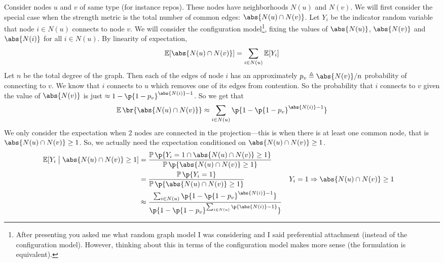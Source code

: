 \documentclass{pset}
\begin{document}
Consider nodes $u$ and $v$ of same type (for instance repos).
These nodes have neighborhoods $N(u)$ and $N(v)$.
We will first consider the special case when the strength metric is
the total number of common edges: $\abs{N(u) \cap N(v)}$.
Let $Y_i$ be the indicator random variable that node $i \in N(u)$
connects to node $v$. 
We will consider the configuration model\footnote{After presenting you asked me what random graph model I was considering and I said preferential attachment (instead of the configuration model). However, thinking about this in terms of the configuration model makes more sense (the formulation is equivalent).}, 
fixing the values of $\abs{N(u)}$, $\abs{N(v)}$ and $\abs{N(i)}$ for all $i \in N(u)$.
By linearity of expectation, 
\[\Exp[\abs{N(u) \cap N(v)}] = \sum_{i\in N(u)} \Exp[Y_i]\]
Let $n$ be the total degree of the graph.
Then each of the edges of node $i$
has an approximately $p_v \triangleq \abs{N(v)} / n$ probability of
connecting to $v$. 
We know that $i$ connects to $u$ which removes one of its edges from contention.
So the probability that $i$ connects to $v$ given the value of $\abs{N(v)}$
is just $\approx 1 - \p{1 - p_v}^{\abs{N(i)} - 1}$.
So we get that
\[\Exp\br{\abs{N(u) \cap N(v)}} 
\approx  \sum_{i\in N(u)} \p{1 - \p{1 - p_v}^{\abs{N(i)} - 1}}\]
We only consider the expectation when 2 nodes are connected in the
projection---this is when there is at least one common
node, that is $\abs{N(u) \cap N(v)} \geq 1$. So, we actually need the expectation
conditioned on $\abs{N(u) \cap N(v)} \geq 1$.
\begin{align*}
    \Exp[Y_i \;\big|\; \abs{N(u) \cap N(v)} \geq 1]
    &= \frac{\Pr\p{Y_i = 1 \cap \abs{N(u) \cap N(v)} \geq 1}}
    {\Pr\p{\abs{N(u) \cap N(v)} \geq 1}} \\
    &= \frac{\Pr\p{Y_i = 1}}
    {\Pr\p{\abs{N(u) \cap N(v)} \geq 1}} && Y_i = 1 \implies \abs{N(u) \cap N(v)} \geq 1\\
    &\approx \frac{\sum_{i\in N(u)} \p{1 - \p{1 - p_v}^{\abs{N(i)} - 1}}}
    { \p{1 - \p{1 - p_v}^{ \sum_{i\in N(u)} \p{\abs{N(i)} - 1}}}} \\
\end{align*}
\end{document}
